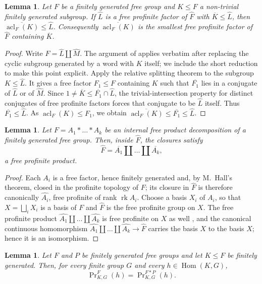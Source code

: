 \documentclass[11pt]{amsart}
\theoremstyle{plain}
\newtheorem{lemma}[theorem]{Lemma}
\theoremstyle{definition}
\newcommand{\acl}{\operatorname{acl}}
\newcommand{\rk}{\operatorname{rk}}
\newcommand{\Hom}{\operatorname{Hom}}
\newcommand{\Fhat}{\widehat{F}}
\begin{document}
\begin{lemma}\label{lem:smallest-factor}
Let $F$ be a finitely generated free group and $K\le F$ a non-trivial finitely
generated subgroup. If $\widehat L$ is a free profinite factor of $\Fhat$ with
$\overline K\le\widehat L$, then $\overline{\acl_F(K)}\le\widehat L$.
Consequently $\overline{\acl_F(K)}$ is the smallest free profinite factor of
$\Fhat$ containing $\overline K$.
\end{lemma}
\begin{proof}
Write $\Fhat=\widehat L\amalg\widehat M$. The argument of
\cite[Proposition 6.2]{JSZ} applies verbatim after replacing the cyclic
subgroup generated by a word with $K$ itself; we include the short reduction
to make this point explicit.  Apply the relative splitting theorem
\cite[Theorem 4.1]{JSZ} to the subgroup $K\le\widehat L$.  It gives a free
factor $F_1\le F$ containing $K$ such that $\overline{F_1}$ lies in a conjugate
of $\widehat L$ or of $\widehat M$.  Since
$1\neq\overline K\le\overline{F_1}\cap\widehat L$, the
trivial-intersection property for distinct conjugates of free profinite
factors \cite[Proposition 9.1.12]{RZ} forces that conjugate to be
$\widehat L$ itself.  Thus $\overline{F_1}\le\widehat L$.  As
$\acl_F(K)\le F_1$, we obtain
$\overline{\acl_F(K)}\le\overline{F_1}\le\widehat L$.
\end{proof}
\begin{lemma}\label{lem:free-prof-prod}
Let $F=A_1*\dots*A_k$ be an internal free product decomposition of a finitely
generated free group. Then, inside $\Fhat$, the closures satisfy
\[
  \Fhat=\overline{A_1}\amalg\dots\amalg\overline{A_k},
\]
a free profinite product.
\end{lemma}
\begin{proof}
Each $A_i$ is a free factor, hence finitely generated and, by M.~Hall's theorem,
closed in the profinite topology of $F$; its closure in $\Fhat$ is therefore
canonically $\widehat{A_i}$, free profinite of rank $\rk A_i$. Choose a basis
$X_i$ of $A_i$, so that $X=\bigsqcup_iX_i$ is a basis of $F$ and $\Fhat$ is the
free profinite group on $X$. The free profinite product
$\widehat{A_1}\amalg\dots\amalg\widehat{A_k}$ is free profinite on $X$ as well
\cite[Ch.~9]{RZ}, and the canonical continuous homomorphism
$\widehat{A_1}\amalg\dots\amalg\widehat{A_k}\to\Fhat$ carries the basis $X$ to
the basis $X$; hence it is an isomorphism.
\end{proof}
\begin{lemma}\label{lem:measure-stable}
Let $F$ and $P$ be finitely generated free groups and let $K\le F$ be finitely
generated. Then, for every finite group $G$ and every $h\in\Hom(K,G)$,
\[
  \Pr\nolimits^{F}_{K,G}(h)=\Pr\nolimits^{F*P}_{K,G}(h).
\]
\end{lemma}
\end{document}
